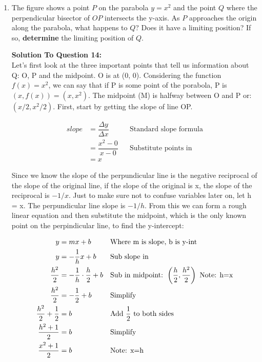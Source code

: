 \documentclass[12pt]{book}
\begin{document}
\begin{enumerate}
\newpage


\item The figure shows a point $P$ on the parabola $y=x^2$ and the point $Q$ where the perpendicular bisector of $OP$ intersects the y-axis. As $P$ approaches the origin along the parabola, what happens to $Q$? Does it have a limiting position? If so, \textbf{determine} the limiting position of $Q$. 

\vspace{0.3cm} 
\textbf{Solution To Question 14:}\\

Let's first look at the three important points that tell us information 
about Q: O, P and the midpoint. O is at (0, 0). Considering the 
function $f(x) = x^2$, we can say that if P is some point of the porabola, 
P is $(x, f(x)) = (x, x^2)$. The midpoint (M) is halfway between O and P or: 
$( x / 2, x^2 / 2 )$. First, start by getting the slope of line OP.

\addtolength{\jot}{-0.2em}
\begin{align*}
   slope &= \dfrac{\Delta y}{\Delta x} && \text{Standard slope formula} \\
   &= \dfrac{x^2-0}{x-0} && \text{Substitute points in} \\
   &= x
\end{align*}

Since we know the slope of the perpundicular line is the negative reciprocal 
of the slope of the original line, if the slope of the original is x, the 
slope of the reciprocal is $-1/x$. Just to make sure not to confuse variables 
later on, let h = x. The perpundicular line slope is $-1/h$. From this we can 
form a rough linear equation and then substitute the midpoint, which is the only 
known point on the perpindicular line, to find the y-intercept:

\addtolength{\jot}{-0.2em}
\begin{align*}
   y &= mx+b && \text{Where m is slope, b is y-int} \\
   y &= - \dfrac{1}{h} x + b && \text{Sub slope in} \\
   \dfrac{h^2}{2} &= - \dfrac{1}{h} \cdot \dfrac{h}{2} + b && \text{Sub in midpoint: } \left( \dfrac{h}{2}, \dfrac{h^2}{2} \right) \text{\space Note: h=x} \\
   \dfrac{h^2}{2} &= - \dfrac{1}{2} + b && \text{Simplify} \\
   \dfrac{h^2}{2} + \dfrac{1}{2} &= b && \text{Add } \dfrac{1}{2} \text{ to both sides} \\
   \dfrac{h^2 + 1}{2} &= b && \text{Simplify} \\
   \dfrac{x^2 + 1}{2} &= b && \text{Note: x=h} \\
\end{align*}


\end{enumerate}
\end{document}
